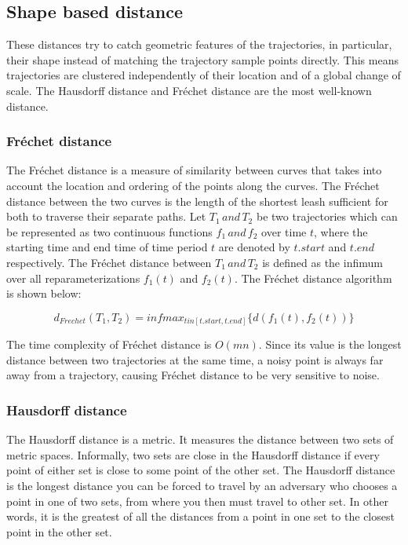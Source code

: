\documentclass[a4paper, 12pt]{article}
\begin{document}
\subsection{Shape based distance}
These distances try to catch geometric features of the trajectories, in particular, their shape instead of matching the trajectory sample points directly. This means trajectories are clustered independently of their location and of a global change of scale. The Hausdorff distance and Fréchet distance are the most well-known distance.

\subsubsection{Fréchet distance}
The Fréchet distance is a measure of similarity between curves that takes into account the location and ordering of the points along the curves. The Fréchet distance between the two curves is the length of the shortest leash sufficient for both to traverse their separate paths. Let $T_{1}\,and\,T_{2}$ be two trajectories which can be represented as two continuous functions $f_{1}\,and\,f_{2}$ over time $t$, where the starting time and end time of time period $t$ are denoted by $t.start$ and $t.end$ respectively. The Fréchet distance between $T_{1}\,and\,T_{2}$ is defined as the infimum over all reparameterizations $f_{1}(t)$ and $f_{2}(t)$. The Fréchet distance algorithm is shown below:

\begin{equation} \label{eq6}
    d_{Frechet}(T_{1},T_{2}) = infmax_{t in [t.start, t.end]} \{d(f_{1}(t), f_{2}(t))\}
\end{equation}

The time complexity of Fréchet distance is $O(mn)$. Since its value is the longest distance between two trajectories at the same time, a noisy point is always far away from a trajectory, causing Fréchet distance to be very sensitive to noise.

\subsubsection{Hausdorff distance}
The Hausdorff distance is a metric. It measures the distance between two sets of metric spaces. Informally, two sets are close in the Hausdorff distance if every point of either set is close to some point of the other set. The Hausdorff distance is the longest distance you can be forced to travel by an adversary who chooses a point in one of two sets, from where you then must travel to other set. In other words, it is the greatest of all the distances from a point in one set to the closest point in the other set.
\end{document}
